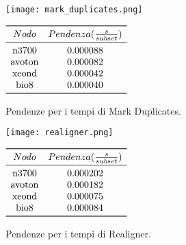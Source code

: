 \begin{table}[H]
  \begin{minipage}[b]{0.4\linewidth}
	\centering
	\texttt{[image: mark\_duplicates.png]}
	\label{subfig:MD}
  \end{minipage}
  \hfill  
  \begin{varwidth}[b]{0.4\linewidth}
    \centering
	$\begin{array}{*{2}{c}}
		\toprule
			Nodo & Pendenza(\frac{s}{subset})\\
		\midrule
			\text{n3700} &  0.000088  \\
			\text{avoton} &  0.000082 \\
			\text{xeond} &  0.000042 \\
			\text{bio8} &  0.000040 \\
		\bottomrule
	\end{array}$
    \caption{Pendenze per i tempi di Mark Duplicates.}
	\label{tab:Md}
  \end{varwidth}%
\end{table}

\begin{table}[H]
  \begin{minipage}[b]{0.4\linewidth}
	\centering
	\texttt{[image: realigner.png]}
	\label{subfig:Rlg}
  \end{minipage}
  \hfill  
  \begin{varwidth}[b]{0.4\linewidth}
	\centering
	$\begin{array}{*{2}{c}}
		\toprule
			Nodo & Pendenza(\frac{s}{subset})\\
		\midrule
			\text{n3700} &  0.000202 \\
			\text{avoton} &  0.000182 \\
			\text{xeond} & 0.000075 \\
			\text{bio8} & 0.000084 \\
		\bottomrule
	\end{array}$
    \caption{Pendenze per i tempi di Realigner.}
	\label{tab:Rlg}
  \end{varwidth}%
\end{table}

